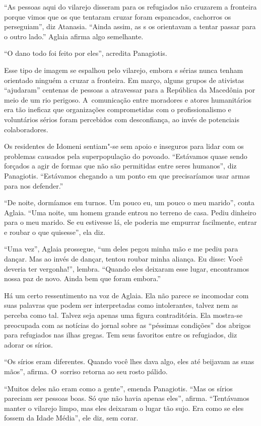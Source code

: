 ``As pessoas aqui do vilarejo disseram para os refugiados não cruzarem a
fronteira porque vimos que os que tentaram cruzar foram espancados,
cachorros os perseguiam'', diz Atanasia. ``Ainda assim, as s os
orientavam a tentar passar para o outro lado.'' Aglaia afirma algo
semelhante.

``O dano todo foi feito por eles'', acredita Panagiotis.

Esse tipo de imagem se espalhou pelo vilarejo, embora s sérias nunca
tenham orientado ninguém a cruzar a fronteira. Em março, alguns grupos de
ativistas ``ajudaram'' centenas de pessoas a atravessar para a República
da Macedônia por meio de um rio perigoso. A~comunicação entre
moradores e atores humanitários era tão ineficaz que organizações
comprometidas com o profissionalismo e voluntários sérios foram
percebidos com desconfiança, ao invés de potenciais colaboradores.

Os residentes de Idomeni sentiam"-se sem apoio e inseguros para lidar com
os problemas causados pela superpopulação do povoado. ``Estávamos quase
sendo forçados a agir de formas que não são permitidas entre seres
humanos'', diz Panagiotis. ``Estávamos chegando a um ponto em que
precisaríamos usar armas para nos defender.''

``De noite, dormíamos em turnos. Um pouco eu, um pouco o meu marido'',
conta Aglaia. ``Uma noite, um homem grande entrou no terreno de casa.
Pediu dinheiro para o meu marido. Se eu estivesse lá, ele poderia me
empurrar facilmente, entrar e roubar o que quisesse'', ela diz.

``Uma vez'', Aglaia prossegue, ``um deles pegou minha mão e me pediu
para dançar. Mas ao invés de dançar, tentou roubar minha aliança. Eu
disse: Você deveria ter vergonha!'', lembra. ``Quando eles deixaram esse lugar,
encontramos nossa paz de novo. Ainda bem que foram embora.''

Há um certo ressentimento na voz de Aglaia. Ela não parece se incomodar
com suas palavras que podem ser interpretadas como intolerantes, talvez nem
as perceba como tal. Talvez seja apenas uma figura contraditória.
Ela mostra-se preocupada com as notícias do jornal sobre as ``péssimas
condições'' dos abrigos para refugiados nas ilhas gregas. Tem seus
favoritos entre os refugiados, diz adorar os sírios.

``Os sírios eram diferentes. Quando você lhes dava algo, eles até
beijavam as suas mãos'', afirma. O~sorriso retorna ao seu rosto pálido.

``Muitos deles não eram como a gente'', emenda Panagiotis. ``Mas os
sírios pareciam ser pessoas boas. Só que não havia apenas eles'',
afirma. ``Tentávamos manter o vilarejo limpo, mas eles deixaram o lugar
tão sujo. Era como se eles fossem da Idade Média'', ele diz, sem corar.


